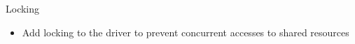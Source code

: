\setuplabframe
{Locking}
{
  \begin{itemize}
  \item Add locking to the driver to prevent concurrent accesses to
    shared resources
  \end{itemize}
}
